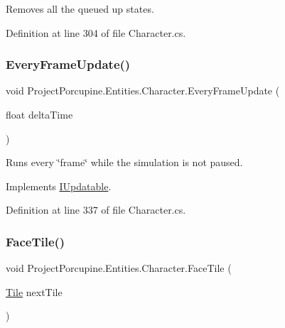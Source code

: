 Removes all the queued up states. 



Definition at line 304 of file Character.\+cs.

\mbox{\label{class_project_porcupine_1_1_entities_1_1_character_ae3c85ddd163fbb4680572fb03e7fc6fc}} 
\subsubsection{\texorpdfstring{Every\+Frame\+Update()}{EveryFrameUpdate()}}
{\footnotesize\ttfamily void Project\+Porcupine.\+Entities.\+Character.\+Every\+Frame\+Update (\begin{DoxyParamCaption}\item[{float}]{delta\+Time }\end{DoxyParamCaption})}



Runs every \char`\"{}frame\char`\"{} while the simulation is not paused. 



Implements \hyperlink{interface_i_updatable_a07ea8d8e0858fd96c18baef481632c9d}{I\+Updatable}.



Definition at line 337 of file Character.\+cs.

\mbox{\label{class_project_porcupine_1_1_entities_1_1_character_ac0d176f59c1c385b90be580ab3cfa020}} 
\subsubsection{\texorpdfstring{Face\+Tile()}{FaceTile()}}
{\footnotesize\ttfamily void Project\+Porcupine.\+Entities.\+Character.\+Face\+Tile (\begin{DoxyParamCaption}\item[{\hyperlink{class_tile}{Tile}}]{next\+Tile }\end{DoxyParamCaption})}



